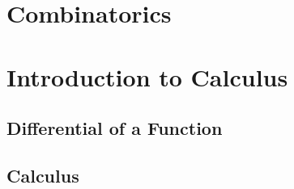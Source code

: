 \documentclass[mathserif,10pt]{beamer}
\begin{document}
\section{Combinatorics}



\section{Introduction to Calculus}
\subsection{Differential of a Function}
\subsection{Calculus}




{\1
\begin{frame}
\end{frame}}
\end{document}
